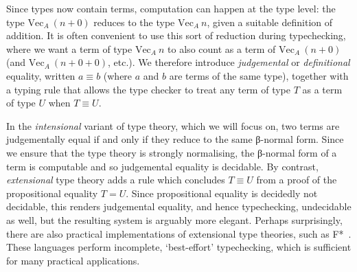 \documentclass{scrartcl}
\theoremstyle{definition}
\renewcommand{\Vec}{\ensuremath{\mathrm{Vec}}}
\begin{document}
Since types now contain terms, computation can happen at the type level: the type $\Vec_{A}~(n + 0)$ reduces to the type $\Vec_{A}~n$, given a suitable definition of addition.
It is often convenient to use this sort of reduction during typechecking, where we want a term of type $\Vec_{A}~n$ to also count as a term of $\Vec_{A}~(n + 0)$ (and $\Vec_{A}~(n + 0 + 0)$, etc.).
We therefore introduce \emph{judgemental} or \emph{definitional} equality, written $a ≡ b$ (where $a$ and $b$ are terms of the same type), together with a typing rule that allows the type checker to treat any term of type $T$ as a term of type $U$ when $T ≡ U$.

In the \emph{intensional} variant of type theory, which we will focus on, two terms are judgementally equal if and only if they reduce to the same β-normal form.
Since we ensure that the type theory is strongly normalising, the β-normal form of a term is computable and so judgemental equality is decidable.
By contrast, \emph{extensional} type theory adds a rule which concludes $T ≡ U$ from a proof of the propositional equality $T = U$.
Since propositional equality is decidedly not decidable, this renders judgemental equality, and hence typechecking, undecidable as well, but the resulting system is arguably more elegant.
Perhaps surprisingly, there are also practical implementations of extensional type theories, such as F*~\cite{DBLP:conf/popl/SwamyHKRDFBFSKZ16}.
These languages perform incomplete, \enquote*{best-effort} typechecking, which is sufficient for many practical applications.
\end{document}
